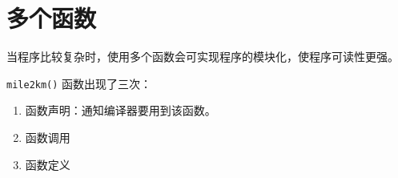 \section{多个函数}
\begin{frame}[fragile]\ft{\secname}
  当程序比较复杂时，使用多个函数会可实现程序的模块化，使程序可读性更强。
\end{frame}

\begin{frame}\ft{\secname}

\end{frame}

\begin{frame}[fragile]\ft{\secname}
\lstinline|mile2km()| 函数出现了三次：\vspace{0.1in}

\begin{enumerate}
\item 函数声明：通知编译器要用到该函数。\\[0.1in]
\item 函数调用\\[0.1in]
\item 函数定义
\end{enumerate}
\end{frame}
